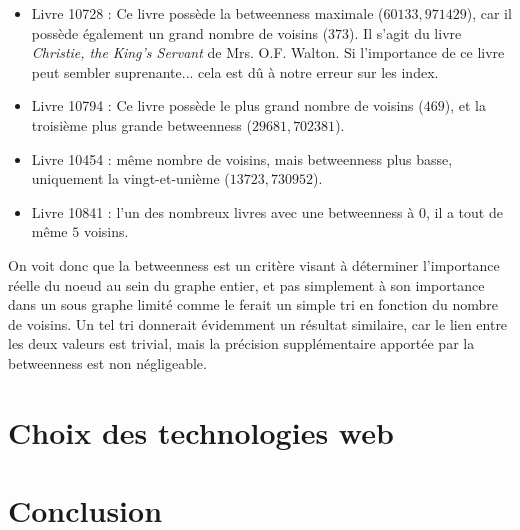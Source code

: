 \documentclass{article}
\begin{document}
\begin{itemize}
\item Livre 10728 : Ce livre possède la betweenness maximale ($60133,971429$), car il possède également un grand nombre de voisins ($373$). Il s'agit du livre  \textit{Christie, the King's Servant} de Mrs. O.F. Walton. Si l'importance de ce livre peut sembler suprenante... cela est dû à notre erreur sur les index.
\item Livre 10794 : Ce livre possède le plus grand nombre de voisins ($469$), et la troisième plus grande betweenness ($29681,702381$).
\item Livre 10454 : même nombre de voisins, mais betweenness plus basse, uniquement la vingt-et-unième ($13723,730952$).
\item Livre 10841 : l'un des nombreux livres avec une betweenness à $0$, il a tout de même $5$ voisins.\\
\end{itemize}

On voit donc que la betweenness est un critère visant à déterminer l'importance réelle du noeud au sein du graphe entier, et pas simplement à son importance dans un sous graphe limité comme le ferait un simple tri en fonction du nombre de voisins. Un tel tri donnerait évidemment un résultat similaire, car le lien entre les deux valeurs est trivial, mais la précision supplémentaire apportée par la betweenness est non négligeable.

\section{Choix des technologies web}

\section*{Conclusion}


{}


\newpage

\tableofcontents
{}
\end{document}
